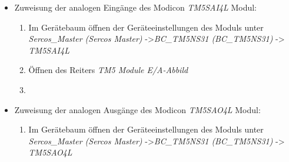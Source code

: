 \documentclass[../../../Bachelorarbeit.tex]{subfiles}
\begin{document}
\begin{itemize}
\begin{enumerate}
\begin{minipage}[t]{\linewidth}
            \raggedright
            \label{fig:my-img29}
        \end{minipage}
    \end{enumerate}
    \item Zuweisung der analogen Eingänge des Modicon \textit{TM5SAI4L} Modul:
    \begin{enumerate}
        \item Im Gerätebaum öffnen der Geräteeinstellungen des Moduls unter \textit{Sercos\_Master (Sercos Master)} ->\small \textit{BC\_TM5NS31 (BC\_TM5NS31)} -> \textit{TM5SAI4L}
        \item \normalsize Öffnen des Reiters \textit{TM5 Module E/A-Abbild}
        \item \begin{minipage}[t]{\linewidth}
            \raggedright
            \label{fig:my-img30}
        \end{minipage}
    \end{enumerate}
    \item Zuweisung der analogen Ausgänge des Modicon \textit{TM5SAO4L} Modul:
    \begin{enumerate}
        \item Im Gerätebaum öffnen der Geräteeinstellungen des Moduls unter \textit{Sercos\_Master (Sercos Master)} ->\small \textit{BC\_TM5NS31 (BC\_TM5NS31)} -> \textit{TM5SAO4L}

\end{enumerate}
\end{itemize}
\end{document}
